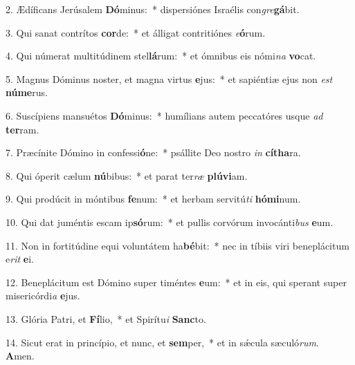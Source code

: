 2. Ædíficans Jerúsalem \textbf{Dó}minus:~*  dispersiónes Israélis con\textit{gre}\textbf{gá}bit.\

3. Qui sanat contrítos \textbf{cor}de:~*  et álligat contritiónes \textit{e}\textbf{ó}rum.\

4. Qui númerat multitúdinem stel\textbf{lá}rum:~*  et ómnibus eis nómi\textit{na} \textbf{vo}cat.\

5. Magnus Dóminus noster, et magna virtus \textbf{e}jus:~*  et sapiéntiæ ejus non \textit{est} \textbf{nú}\textbf{me}rus.\

6. Suscípiens mansuétos \textbf{Dó}minus:~*  humílians autem peccatóres usque \textit{ad} \textbf{ter}ram.\

7. Præcínite Dómino in confessi\textbf{ó}ne:~*  psállite Deo nostro \textit{in} \textbf{cí}\textbf{tha}ra.\

8. Qui óperit cælum \textbf{nú}bibus:~*  et parat ter\textit{ræ} \textbf{plú}\textbf{vi}am.\

9. Qui prodúcit in móntibus \textbf{fe}num:~*  et herbam servitú\textit{ti} \textbf{hó}\textbf{mi}num.\

10. Qui dat juméntis escam ip\textbf{só}rum:~*  et pullis corvórum invocánti\textit{bus} \textbf{e}um.\

11. Non in fortitúdine equi voluntátem ha\textbf{bé}bit:~*  nec in tíbiis viri beneplácitum e\textit{rit} \textbf{e}i.\

12. Beneplácitum est Dómino super timéntes \textbf{e}um:~*  et in eis, qui sperant super misericórdi\textit{a} \textbf{e}jus.\

13. Glória Patri, et \textbf{Fí}lio,~*  et Spirítu\textit{i} \textbf{Sanc}to.\

14. Sicut erat in princípio, et nunc, et \textbf{sem}per,~*  et in sǽcula sæculó\textit{rum}. \textbf{A}men.\

